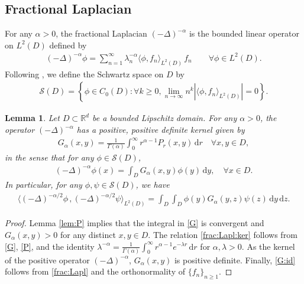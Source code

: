 \documentclass[reqno]{amsart}
\newcommand{\R}{\mathbb R}
\renewcommand{\d}{\mathrm d}
\newcommand{\1}{\mathbf 1}
\numberwithin{equation}{section}
\newtheorem{lemma}[theorem]{Lemma}
\theoremstyle{definition}
\begin{document}
\subsection{Fractional Laplacian}

For any $\alpha>0$, the fractional Laplacian $(-\Delta)^{-\alpha}$ is the bounded linear operator on $L^2(D)$ defined by
\begin{align}\label{frac:Lapl}
    (-\Delta)^{-\alpha} \phi = \sum_{n=1}^\infty \lambda_n^{-\alpha}\langle \phi,f_n \rangle_{L^2(D)}\, f_n \qquad \forall \phi \in L^2(D).
\end{align}
Following \cite{BC23, BCHOTW}, we define the Schwartz space on $D$ by
\begin{align}\label{S(D)}
	\mathcal{S}(D) = \left\{ \phi \in C_0(D) : \forall k \ge 0, \lim_{n\to \infty} n^k\left|\langle \phi, f_n \rangle_{L^2(D)}\right| = 0 \right\}.
\end{align}

\begin{lemma}
Let $D \subset \R^d$ be a bounded Lipschitz domain.
    For any $\alpha>0$, the operator $(-\Delta)^{-\alpha}$ has a positive, positive definite kernel given by
    \begin{align}\label{G}
        G_{\alpha}(x,y) = \frac{1}{\Gamma(\alpha)} \int_0^\infty r^{\alpha-1} P_r(x,y) \, \d r \quad \forall x, y \in D,
    \end{align}
    in the sense that for any $\phi \in \mathcal{S}(D)$,
    \begin{align}\label{frac:Lapl:ker}
        (-\Delta)^{-\alpha} \phi(x) = \int_D G_\alpha(x,y) \phi(y) \, \d y, \quad \forall x \in D.
    \end{align}
    In particular, for any $\phi, \psi \in \mathcal{S}(D)$, we have
    \begin{align}\label{G:id}
        \big\langle (-\Delta)^{-\alpha/2}\phi \,, (-\Delta)^{-\alpha/2}\psi \big\rangle_{L^2(D)} = \int_D \int_D \phi(y) G_{\alpha}(y,z) \psi(z) \, \d y\, \d z.
    \end{align}   
\end{lemma}

\begin{proof}
Lemma \ref{lem:P} implies that the integral in \eqref{G} is convergent and $G_\alpha(x,y)>0$ for any distinct $x,y \in D$.
The relation \eqref{frac:Lapl:ker} follows from \eqref{G}, \eqref{P}, and the identity 
$\lambda^{-\alpha} = \frac{1}{\Gamma(\alpha)}\int_0^\infty r^{\alpha-1} e^{-\lambda r}\, \d r$ for $\alpha,\lambda>0$.
As the kernel of the positive operator $(-\Delta)^{-\alpha}$, $G_\alpha(x,y)$ is positive definite.
Finally, \eqref{G:id} follows from \eqref{frac:Lapl} and the orthonormality of $\{f_n\}_{n\ge1}$.
\end{proof}
\end{document}
